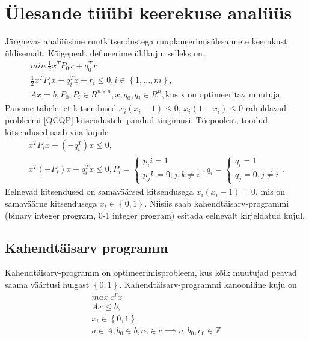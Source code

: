 \documentclass[a4paper,12pt]{article}
\numberwithin{equation}{section}
\theoremstyle{definition}
\begin{document}
\section{Ülesande t\"u\"ubi keerekuse anal\"u\"us}
Järgnevas anal\"u\"usime ruutkitsendustega ruuplaneerimis\"ulesannete keerukust \"uldisemalt. Kõigepealt defineerime \"uldkuju, selleks on,
\begin{equation}
\begin{gathered}
\label{QCQP}
min~ \frac{1}{2}x^T P_0 x + q_0^Tx  \\
\frac{1}{2}x^T P_i x + q_i^Tx + r_i \leq 0 , i \in \left\lbrace 1,...,m \right\rbrace, \\
Ax = b, P_0,P_i \in R^{n \times n}, x,q_0,q_i \in R^{n}, \text{kus x on optimeeritav muutuja.} 
\end{gathered}
\end{equation}
Paneme tähele, et kitsendused $x_i(x_i-1) \leq 0 $, $x_i(1-x_i) \leq 0 $ rahuldavad probleemi  \eqref{QCQP} kitsendustele pandud tingimusi. Tõepoolest, toodud kitsendused saab viia kujule
\begin{equation*}
\begin{gathered}
x^TP_i x + (-q_i^T) x \leq 0, \\
x^T(-P_i)x + q_i^Tx \leq 0, P_i =
\begin{cases}
p_ii = 1 \\ 
p_jk = 0, j,k \neq i
\end{cases}, 
q_i = \begin{cases}
q_i = 1 \\
q_j = 0, j \neq i
\end{cases}.
\end{gathered}
\end{equation*}
Eelnevad kitsendused on samaväärsed kitsendusega $x_i(x_i-1) = 0$, mis on samaväärne kitsendusega $x_i \in \left\lbrace 0,1 \right\rbrace$. Niisiis saab kahendtäisarv-programmi (binary integer program, 0-1 integer program) esitada eelnevalt kirjeldatud kujul.

\subsection{Kahendtäisarv programm}
 Kahendtäisarv-programm on optimeerimisprobleem, kus kõik muutujad peavad saama väärtusi hulgast $\left\lbrace 0,1 \right\rbrace$. Kahendtäisarv-programmi kanooniline kuju on 
\begin{equation}
\begin{gathered}
\label{binary}
max~ c^T x \\
Ax \leq b, \\
x_i \in  \left\lbrace 0,1 \right\rbrace, \\
a \in A, b_0 \in  b, c_0 \in c \implies a,b_0,c_0 \in \mathbb{Z} 
\end{gathered}
\end{equation}
\end{document}
